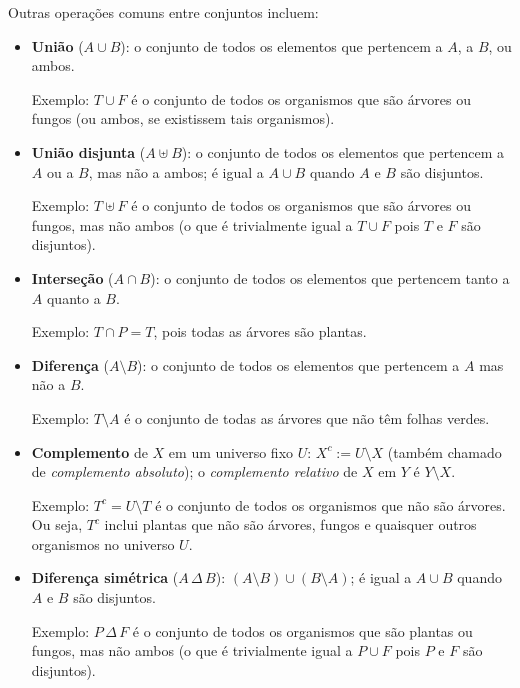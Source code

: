 \documentclass[12pt,a4paper]{article}
\begin{document}
Outras operações comuns entre conjuntos incluem:
\begin{itemize}
    \item \textbf{União} (\(A \cup B\)): o conjunto de todos os elementos que pertencem a \(A\), a \(B\), ou ambos.
    
    Exemplo: \(T \cup F\) é o conjunto de todos os organismos que são árvores ou fungos (ou ambos, se existissem tais organismos).
    
    \item \textbf{União disjunta} (\(A \uplus B\)): o conjunto de todos os elementos que pertencem a \(A\) ou a \(B\), mas não a ambos; é igual a \(A \cup B\) quando \(A\) e \(B\) são disjuntos.
    
    Exemplo: \(T \uplus F\) é o conjunto de todos os organismos que são árvores ou fungos, mas não ambos (o que é trivialmente igual a \(T \cup F\) pois \(T\) e \(F\) são disjuntos).

    \item \textbf{Interseção} (\(A \cap B\)): o conjunto de todos os elementos que pertencem tanto a \(A\) quanto a \(B\).
    
    Exemplo: \(T \cap P = T\), pois todas as árvores são plantas.

    \item \textbf{Diferença} (\(A \setminus B\)): o conjunto de todos os elementos que pertencem a \(A\) mas não a \(B\).
    
    Exemplo: \(T \setminus A\) é o conjunto de todas as árvores que não têm folhas verdes.

    \item \textbf{Complemento} de \(X\) em um universo fixo \(U\): \(X^c := U\setminus X\) (também chamado de \textit{complemento absoluto}); o \textit{complemento relativo} de \(X\) em \(Y\) é \(Y\setminus X\).
    
    Exemplo: \(T^c = U \setminus T\) é o conjunto de todos os organismos que não são árvores. Ou seja, \(T^c\) inclui plantas que não são árvores, fungos e quaisquer outros organismos no universo \(U\).

    \item \textbf{Diferença simétrica} (\(A\,\Delta\, B\)): \((A\setminus B)\cup(B\setminus A)\); é igual a \(A\cup B\) quando \(A\) e \(B\) são disjuntos.
    
    Exemplo: \(P\,\Delta\, F\) é o conjunto de todos os organismos que são plantas ou fungos, mas não ambos (o que é trivialmente igual a \(P \cup F\) pois \(P\) e \(F\) são disjuntos).


\end{itemize}
\end{document}
